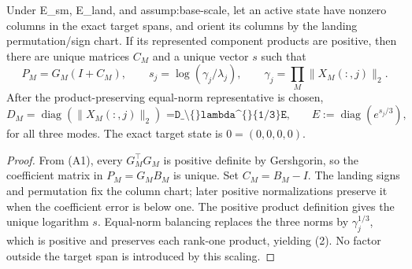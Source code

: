\begin{lemma}\label{lem:step-011-quotient-chart}
Under E\_sm, E\_land, and
assump:base-scale, let an active state have nonzero columns in the exact
target spans, and orient its columns by the landing permutation/sign chart.
If its represented component products are positive, then there are unique
matrices \(C_M\) and a unique vector \(s\) such that
\[
 P_M=G_M(I+C_M),\qquad
 s_j=\log(\gamma_j/\lambda_j),
 \qquad \gamma_j=\prod_M\|X_M(:,j)\|_2.
 \tag{1}
\]
After the product-preserving equal-norm representative is chosen,
\[
 D_M=\operatorname{diag}(\|X_M(:,j)\|_2)
\texttt{  =D\_\textbackslash\{\}lambda\textasciicircum\{\}\{1/3\}E,}
 \qquad E:=\operatorname{diag}(e^{s_j/3}),
 \tag{2}
\]
for all three modes. The exact target state is \(0=(0,0,0,0)\).

\begin{proof}
From (A1), every \(G_M^\top G_M\) is positive
definite by Gershgorin, so the coefficient matrix in
\(P_M=G_MB_M\) is unique. Set \(C_M=B_M-I\). The landing signs and
permutation fix the column chart; later positive normalizations preserve it
when the coefficient error is below one. The positive product definition
gives the unique logarithm \(s\). Equal-norm balancing replaces the three
norms by \(\gamma_j^{1/3}\), which is positive and preserves each rank-one
product, yielding (2). No factor outside the target span is introduced by
this scaling.


\end{proof}
\end{lemma}
